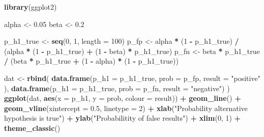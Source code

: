 \documentclass[
  12pt,
]{book}
\newenvironment{Shaded}{\begin{snugshade}}{\end{snugshade}}
\newcommand{\DataTypeTok}[1]{\textcolor[rgb]{0.13,0.29,0.53}{#1}}
\newcommand{\DecValTok}[1]{\textcolor[rgb]{0.00,0.00,0.81}{#1}}
\newcommand{\FloatTok}[1]{\textcolor[rgb]{0.00,0.00,0.81}{#1}}
\newcommand{\KeywordTok}[1]{\textcolor[rgb]{0.13,0.29,0.53}{\textbf{#1}}}
\newcommand{\NormalTok}[1]{#1}
\newcommand{\OperatorTok}[1]{\textcolor[rgb]{0.81,0.36,0.00}{\textbf{#1}}}
\newcommand{\StringTok}[1]{\textcolor[rgb]{0.31,0.60,0.02}{#1}}
\begin{document}
\begin{Shaded}
\begin{Highlighting}[]
\KeywordTok{library}\NormalTok{(ggplot2)}


\NormalTok{alpha \textless{}{-}}\StringTok{ }\FloatTok{0.05}
\NormalTok{beta \textless{}{-}}\StringTok{ }\FloatTok{0.2} 

\NormalTok{p\_h1\_true \textless{}{-}}\StringTok{ }\KeywordTok{seq}\NormalTok{(}\DecValTok{0}\NormalTok{, }\DecValTok{1}\NormalTok{, }\DataTypeTok{length =} \DecValTok{100}\NormalTok{)}
\NormalTok{p\_fp \textless{}{-}}\StringTok{ }\NormalTok{alpha }\OperatorTok{*}\StringTok{ }\NormalTok{(}\DecValTok{1} \OperatorTok{{-}}\StringTok{ }\NormalTok{p\_h1\_true) }\OperatorTok{/}
\StringTok{  }\NormalTok{(alpha }\OperatorTok{*}\StringTok{ }\NormalTok{(}\DecValTok{1} \OperatorTok{{-}}\StringTok{ }\NormalTok{p\_h1\_true) }\OperatorTok{+}\StringTok{ }\NormalTok{(}\DecValTok{1} \OperatorTok{{-}}\StringTok{ }\NormalTok{beta) }\OperatorTok{*}\StringTok{ }\NormalTok{p\_h1\_true)}
\NormalTok{p\_fn \textless{}{-}}\StringTok{ }\NormalTok{beta }\OperatorTok{*}\StringTok{ }\NormalTok{p\_h1\_true }\OperatorTok{/}
\StringTok{  }\NormalTok{(beta }\OperatorTok{*}\StringTok{ }\NormalTok{p\_h1\_true }\OperatorTok{+}\StringTok{ }\NormalTok{(}\DecValTok{1} \OperatorTok{{-}}\StringTok{ }\NormalTok{alpha) }\OperatorTok{*}\StringTok{ }\NormalTok{(}\DecValTok{1} \OperatorTok{{-}}\StringTok{ }\NormalTok{p\_h1\_true))}

\NormalTok{dat \textless{}{-}}\StringTok{ }\KeywordTok{rbind}\NormalTok{(}
  \KeywordTok{data.frame}\NormalTok{(}\DataTypeTok{p\_h1 =}\NormalTok{ p\_h1\_true, }\DataTypeTok{prob =}\NormalTok{ p\_fp, }\DataTypeTok{result =} \StringTok{"positive"}\NormalTok{ ),}
  \KeywordTok{data.frame}\NormalTok{(}\DataTypeTok{p\_h1 =}\NormalTok{ p\_h1\_true, }\DataTypeTok{prob =}\NormalTok{ p\_fn, }\DataTypeTok{result =} \StringTok{"negative"}\NormalTok{)}
\NormalTok{)}
\KeywordTok{ggplot}\NormalTok{(dat, }\KeywordTok{aes}\NormalTok{(}\DataTypeTok{x =}\NormalTok{ p\_h1, }\DataTypeTok{y =}\NormalTok{ prob, }\DataTypeTok{colour =}\NormalTok{ result)) }\OperatorTok{+}
\StringTok{  }\KeywordTok{geom\_line}\NormalTok{() }\OperatorTok{+}
\StringTok{  }\KeywordTok{geom\_vline}\NormalTok{(}\DataTypeTok{xintercept =} \FloatTok{0.5}\NormalTok{, }\DataTypeTok{linetype =} \DecValTok{2}\NormalTok{) }\OperatorTok{+}
\StringTok{  }\KeywordTok{xlab}\NormalTok{(}\StringTok{"Probability alternative hypothesis is true"}\NormalTok{) }\OperatorTok{+}\StringTok{ }
\StringTok{  }\KeywordTok{ylab}\NormalTok{(}\StringTok{"Probabilitity of false results"}\NormalTok{) }\OperatorTok{+}
\StringTok{  }\KeywordTok{xlim}\NormalTok{(}\DecValTok{0}\NormalTok{, }\DecValTok{1}\NormalTok{) }\OperatorTok{+}
\StringTok{  }\KeywordTok{theme\_classic}\NormalTok{()}
\end{Highlighting}
\end{Shaded}
\end{document}

